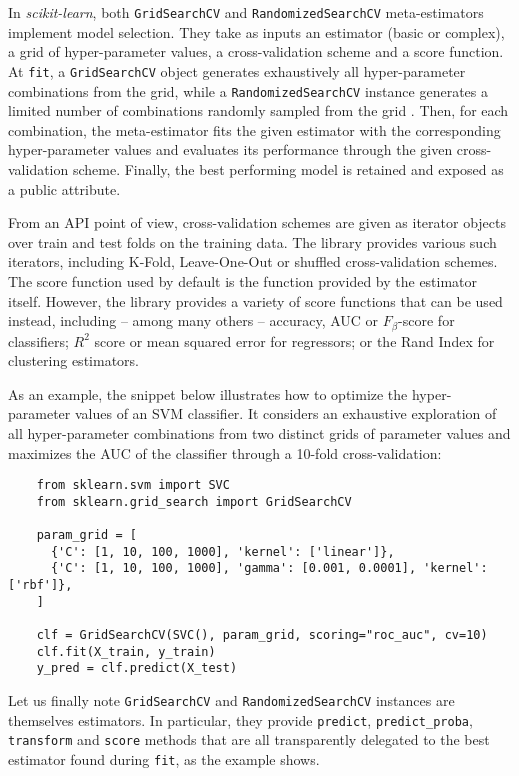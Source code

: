 \documentclass{llncs}
\newcommand{\sklearn}{\textit{scikit-learn}\xspace}
\begin{document}
In \sklearn, both \texttt{GridSearchCV} and \texttt{RandomizedSearchCV} meta-estimators
implement model selection. They take as inputs an estimator (basic or
complex), a grid of hyper-parameter values, a cross-validation scheme and a
score function. At \texttt{fit}, a \texttt{GridSearchCV} object generates
exhaustively all hyper-parameter combinations from the grid, while a
\texttt{RandomizedSearchCV} instance generates a limited number of combinations
randomly sampled from the grid \citep{bergstra2012}. Then, for each combination, the meta-estimator
fits the given estimator with the corresponding hyper-parameter values and
evaluates its performance through the given cross-validation scheme. Finally,
the best performing model is retained and exposed as a public attribute.

From an API point of view, cross-validation schemes are given as iterator
objects over train and test folds on the training data. The library provides
various such iterators, including K-Fold, Leave-One-Out or shuffled
cross-validation schemes. The score function used by default is the function
provided by the estimator itself. However, the library provides a variety of
score functions that can be used instead, including -- among many others --
accuracy, AUC or $F_\beta$-score for classifiers; $R^2$ score or mean squared
error for regressors; or the Rand Index for clustering estimators.

As an example, the snippet below illustrates how to optimize the hyper-parameter
values of an SVM classifier. It considers an exhaustive exploration of all
hyper-parameter combinations from two distinct grids of parameter values and
maximizes the AUC of the classifier through a 10-fold cross-validation:
\begin{verbatim}
    from sklearn.svm import SVC
    from sklearn.grid_search import GridSearchCV

    param_grid = [
      {'C': [1, 10, 100, 1000], 'kernel': ['linear']},
      {'C': [1, 10, 100, 1000], 'gamma': [0.001, 0.0001], 'kernel': ['rbf']},
    ]

    clf = GridSearchCV(SVC(), param_grid, scoring="roc_auc", cv=10)
    clf.fit(X_train, y_train)
    y_pred = clf.predict(X_test)
\end{verbatim}
Let us finally note \texttt{GridSearchCV} and \texttt{RandomizedSearchCV}
instances are themselves estimators. In particular, they provide
\texttt{predict}, \texttt{predict\_proba}, \texttt{transform} and \texttt{score}
methods that are all transparently delegated to the best estimator found during
\texttt{fit}, as the example shows.
\end{document}
